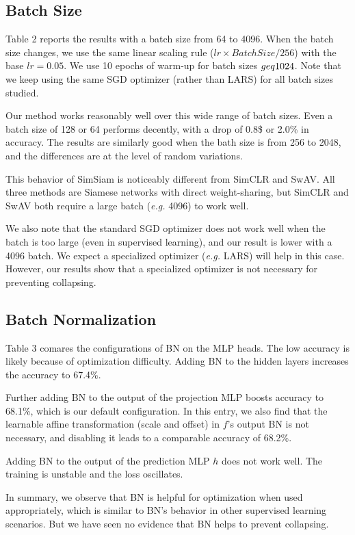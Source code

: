 \documentclass[conference]{IEEEtran}
\begin{document}
\subsection{Batch Size} 
Table 2 reports the results with a batch size from 64 to 4096. When the batch size changes, we use the same linear scaling rule ($lr \times BatchSize/256$) with the base $lr = 0.05$.
We use 10 epochs of warm-up for batch sizes $\\geq 1024$. Note that we keep using the same SGD optimizer (rather than LARS) for all batch sizes studied.

Our method works reasonably well over this wide range of batch sizes. Even a batch size of 128 or 64 performs decently, with a drop of 0.8\$ or 2.0\% in accuracy. The results are similarly good when the bath size is from 256 to 2048, and the differences are at the level of random variations.

This behavior of SimSiam is noticeably different from SimCLR and SwAV. All three methods are Siamese networks with direct weight-sharing, but SimCLR and SwAV both require a large batch (\textit{e.g.} 4096) to work well.

We also note that the standard SGD optimizer does not work well when the batch is too large (even in supervised learning), and our result is lower with a 4096 batch. We expect a specialized optimizer (\textit{e.g.} LARS) will help in this case.
However, our results show that a specialized optimizer is not necessary for preventing collapsing.

\subsection{Batch Normalization}
Table 3 comares the configurations of BN on the MLP heads. The low accuracy is likely because of optimization difficulty. Adding BN to the hidden layers increases the accuracy to 67.4\%.

Further adding BN to the output of the projection MLP boosts accuracy to 68.1\%, which is our default configuration. In this entry, we also find that the learnable affine transformation (scale and offset) in $f$'s output BN is not necessary, and disabling it leads to a comparable accuracy of 68.2\%.

Adding BN to the output of the prediction MLP $h$ does not work well. The training is unstable and the loss oscillates.

In summary, we observe that BN is helpful for optimization when used appropriately, which is similar to BN's behavior in other supervised learning scenarios. 
But we have seen no evidence that BN helps to prevent collapsing.
\end{document}
